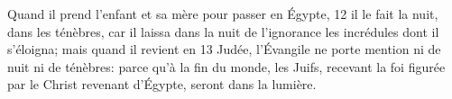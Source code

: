 Quand il prend l'enfant et sa mère pour passer en Égypte,	 
12	 	il le fait la nuit, dans les ténèbres, car il laissa dans la nuit de l’ignorance les incrédules dont il s’éloigna; mais quand il revient en	 
13	 	Judée, l'Évangile ne porte mention ni de nuit ni de ténèbres: parce qu’à la fin du monde, les Juifs, recevant la foi figurée par le Christ revenant d’Égypte, seront dans la lumière.